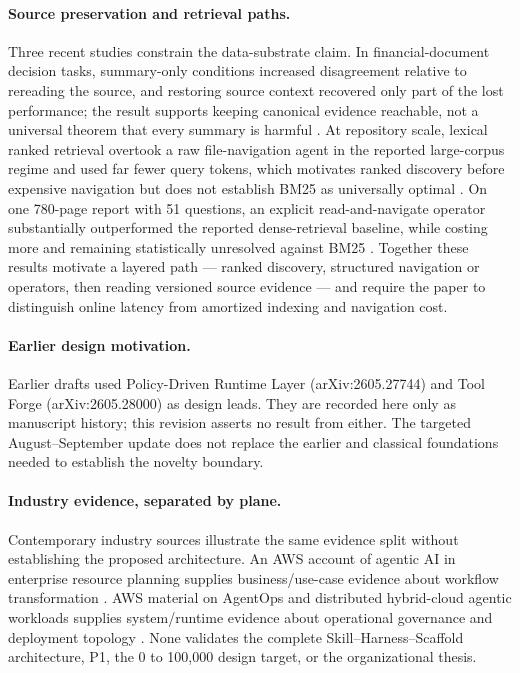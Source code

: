 \documentclass[11pt]{article}
\begin{document}
\paragraph{Source preservation and retrieval paths.}
Three recent studies constrain the data-substrate claim. In financial-document decision tasks, summary-only conditions increased disagreement relative to rereading the source, and restoring source context recovered only part of the lost performance; the result supports keeping canonical evidence reachable, not a universal theorem that every summary is harmful \cite{lee2026summaries}. At repository scale, lexical ranked retrieval overtook a raw file-navigation agent in the reported large-corpus regime and used far fewer query tokens, which motivates ranked discovery before expensive navigation but does not establish BM25 as universally optimal \cite{wang2026bm25scale}. On one 780-page report with 51 questions, an explicit read-and-navigate operator substantially outperformed the reported dense-retrieval baseline, while costing more and remaining statistically unresolved against BM25 \cite{tamang2026beyondtopk}. Together these results motivate a layered path --- ranked discovery, structured navigation or operators, then reading versioned source evidence --- and require the paper to distinguish online latency from amortized indexing and navigation cost.

\paragraph{Earlier design motivation.}
Earlier drafts used Policy-Driven Runtime Layer (arXiv:2605.27744) and Tool Forge (arXiv:2605.28000) as design leads. They are recorded here only as manuscript history; this revision asserts no result from either. The targeted August--September update does not replace the earlier and classical foundations needed to establish the novelty boundary.

\paragraph{Industry evidence, separated by plane.}
Contemporary industry sources illustrate the same evidence split without establishing the proposed architecture. An AWS account of agentic AI in enterprise resource planning supplies business/use-case evidence about workflow transformation \cite{aws2026erp}. AWS material on AgentOps and distributed hybrid-cloud agentic workloads supplies system/runtime evidence about operational governance and deployment topology \cite{aws2026agentops,aws2026hybrid}. None validates the complete Skill--Harness--Scaffold architecture, P1, the 0 to 100{,}000 design target, or the organizational thesis.
\end{document}
